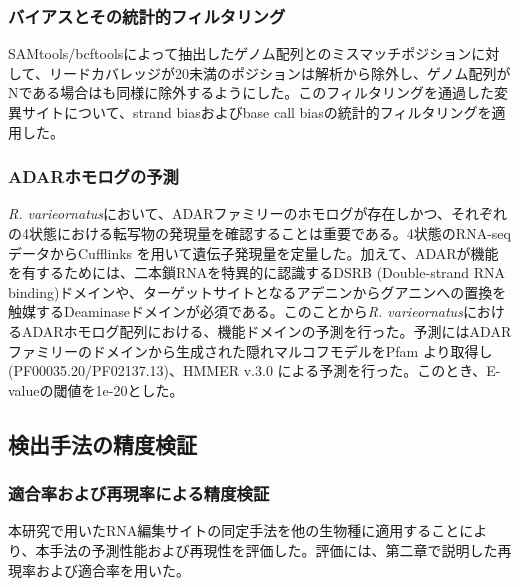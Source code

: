 \subsubsection{バイアスとその統計的フィルタリング}
SAMtools/bcftoolsによって抽出したゲノム配列とのミスマッチポジションに対して、リードカバレッジが20未満のポジションは解析から除外し、ゲノム配列がNである場合はも同様に除外するようにした。このフィルタリングを通過した変異サイトについて、strand biasおよびbase call biasの統計的フィルタリングを適用した。

\subsubsection{ADARホモログの予測}
{\it R. varieornatus}において、ADARファミリーのホモログが存在しかつ、それぞれの4状態における転写物の発現量を確認することは重要である。4状態のRNA-seqデータからCufflinks \citep{pmid22383036}を用いて遺伝子発現量を定量した。加えて、ADARが機能を有するためには、二本鎖RNAを特異的に認識するDSRB (Double-strand RNA binding)ドメインや、ターゲットサイトとなるアデニンからグアニンへの置換を触媒するDeaminaseドメインが必須である。このことから{\it R. varieornatus}におけるADARホモログ配列における、機能ドメインの予測を行った。予測にはADARファミリーのドメインから生成された隠れマルコフモデルをPfam \citep{pmid22127870}より取得し (PF00035.20/PF02137.13)、HMMER v.3.0 \citep{pmid22039361}による予測を行った。このとき、E-valueの閾値を1e-20とした。

\subsection{検出手法の精度検証}
\subsubsection{適合率および再現率による精度検証}
本研究で用いたRNA編集サイトの同定手法を他の生物種に適用することにより、本手法の予測性能および再現性を評価した。評価には、第二章で説明した再現率および適合率を用いた。

